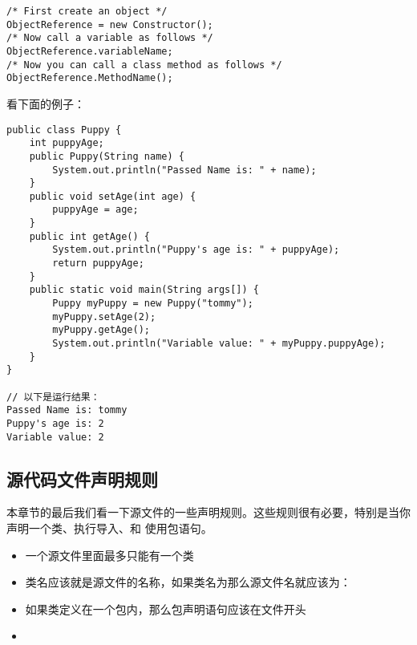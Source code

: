 \documentclass{article}
\begin{document}
\begin{verbatim}
/* First create an object */
ObjectReference = new Constructor();
/* Now call a variable as follows */
ObjectReference.variableName;
/* Now you can call a class method as follows */
ObjectReference.MethodName();
\end{verbatim}

看下面的例子：

\begin{verbatim}
public class Puppy {
	int puppyAge;
	public Puppy(String name) {
		System.out.println("Passed Name is: " + name);
	}
	public void setAge(int age) {
		puppyAge = age;
	}
	public int getAge() {
		System.out.println("Puppy's age is: " + puppyAge);
		return puppyAge;
	}
	public static void main(String args[]) {
		Puppy myPuppy = new Puppy("tommy");
		myPuppy.setAge(2);
		myPuppy.getAge();
		System.out.println("Variable value: " + myPuppy.puppyAge);
	}
}

// 以下是运行结果：
Passed Name is: tommy
Puppy's age is: 2
Variable value: 2
\end{verbatim}

\subsection{源代码文件声明规则}
本章节的最后我们看一下源文件的一些声明规则。这些规则很有必要，特别是当你声明一个类、执行导入、和
使用包语句。
\begin{itemize}
\item 一个源文件里面最多只能有一个类
\item {}类名应该就是源文件的名称，如果类名为那么源文件名就应该为：
\item 如果类定义在一个包内，那么包声明语句应该在文件开头
\item 
\end{itemize}
\end{document}
